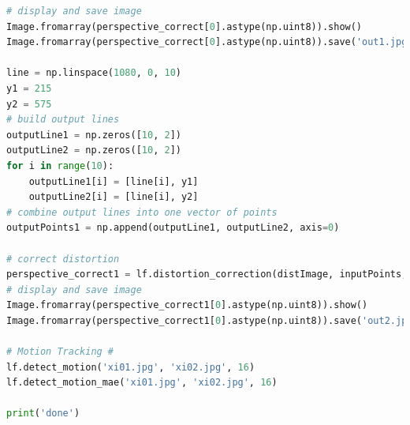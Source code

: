 \documentclass[11pt,a4paper]{article}
\begin{document}
\begin{lstlisting}[language=Python]
# display and save image
Image.fromarray(perspective_correct[0].astype(np.uint8)).show()
Image.fromarray(perspective_correct[0].astype(np.uint8)).save('out1.jpg')

line = np.linspace(1080, 0, 10)
y1 = 215
y2 = 575
# build output lines
outputLine1 = np.zeros([10, 2])
outputLine2 = np.zeros([10, 2])
for i in range(10):
    outputLine1[i] = [line[i], y1]
    outputLine2[i] = [line[i], y2]
# combine output lines into one vector of points
outputPoints1 = np.append(outputLine1, outputLine2, axis=0)

# correct distortion
perspective_correct1 = lf.distortion_correction(distImage, inputPoints, outputPoints1)
# display and save image
Image.fromarray(perspective_correct1[0].astype(np.uint8)).show()
Image.fromarray(perspective_correct1[0].astype(np.uint8)).save('out2.jpg')

# Motion Tracking #
lf.detect_motion('xi01.jpg', 'xi02.jpg', 16)
lf.detect_motion_mae('xi01.jpg', 'xi02.jpg', 16)

print('done')
\end{lstlisting}
\end{document}
